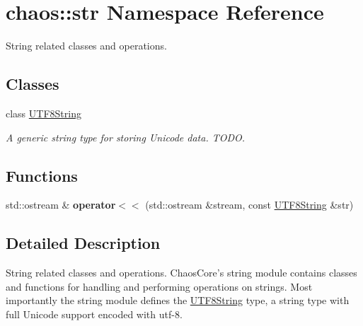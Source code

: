 \hypertarget{namespacechaos_1_1str}{\section{chaos\-:\-:str Namespace Reference}
\label{namespacechaos_1_1str}
}


String related classes and operations.  


\subsection*{Classes}
\begin{DoxyCompactItemize}
\item 
class \hyperlink{classchaos_1_1str_1_1_u_t_f8_string}{U\-T\-F8\-String}
\begin{DoxyCompactList}\small\item\em A generic string type for storing Unicode data. T\-O\-D\-O. \end{DoxyCompactList}\end{DoxyCompactItemize}
\subsection*{Functions}
\begin{DoxyCompactItemize}
\item 
\hypertarget{namespacechaos_1_1str_af8ed01c19bc2b322f36a751694e2dd0c}{std\-::ostream \& {\bfseries operator$<$$<$} (std\-::ostream \&stream, const \hyperlink{classchaos_1_1str_1_1_u_t_f8_string}{U\-T\-F8\-String} \&str)}\label{namespacechaos_1_1str_af8ed01c19bc2b322f36a751694e2dd0c}

\end{DoxyCompactItemize}


\subsection{Detailed Description}
String related classes and operations. Chaos\-Core's string module contains classes and functions for handling and performing operations on strings. Most importantly the string module defines the \hyperlink{classchaos_1_1str_1_1_u_t_f8_string}{U\-T\-F8\-String} type, a string type with full Unicode support encoded with utf-\/8. 